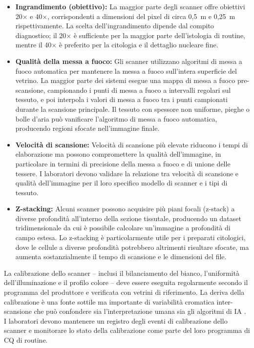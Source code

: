 \begin{itemize}
    \item \textbf{Ingrandimento (obiettivo):} La maggior parte degli scanner offre obiettivi
    20$\times$ e 40$\times$, corrispondenti a dimensioni del pixel di circa 0,5~\textmu m e
    0,25~\textmu m rispettivamente. La scelta dell'ingrandimento dipende dal compito diagnostico;
    il 20$\times$ è sufficiente per la maggior parte dell'istologia di routine, mentre il
    40$\times$ è preferito per la citologia e il dettaglio nucleare fine.

    \item \textbf{Qualità della messa a fuoco:} Gli scanner utilizzano algoritmi di messa a fuoco
    automatica per mantenere la messa a fuoco sull'intera superficie del vetrino. La maggior parte
    dei sistemi esegue una mappa di messa a fuoco pre-scansione, campionando i punti di messa a
    fuoco a intervalli regolari sul tessuto, e poi interpola i valori di messa a fuoco tra i punti
    campionati durante la scansione principale. Il tessuto con spessore non uniforme, pieghe o
    bolle d'aria può vanificare l'algoritmo di messa a fuoco automatica, producendo regioni
    sfocate nell'immagine finale.

    \item \textbf{Velocità di scansione:} Velocità di scansione più elevate riducono i tempi di
    elaborazione ma possono compromettere la qualità dell'immagine, in particolare in termini di
    precisione della messa a fuoco e di unione delle tessere. I laboratori devono validare la
    relazione tra velocità di scansione e qualità dell'immagine per il loro specifico modello di
    scanner e i tipi di tessuto.

    \item \textbf{Z-stacking:} Alcuni scanner possono acquisire più piani focali (z-stack) a
    diverse profondità all'interno della sezione tissutale, producendo un dataset tridimensionale
    da cui è possibile calcolare un'immagine a profondità di campo estesa. Lo z-stacking è
    particolarmente utile per i preparati citologici, dove le cellule a diverse profondità
    potrebbero altrimenti risultare sfocate, ma aumenta sostanzialmente il tempo di scansione e
    le dimensioni del file.
\end{itemize}

La calibrazione dello scanner -- inclusi il bilanciamento del bianco, l'uniformità
dell'illuminazione e il profilo colore -- deve essere eseguita regolarmente secondo il programma
del produttore e verificata con vetrini di riferimento. La deriva della calibrazione è una fonte
sottile ma importante di variabilità cromatica inter-scansione che può confondere sia
l'interpretazione umana sia gli algoritmi di IA \cite{bankhead2022}. I laboratori devono
mantenere un registro degli eventi di calibrazione dello scanner e monitorare lo stato della
calibrazione come parte del loro programma di CQ di routine.

